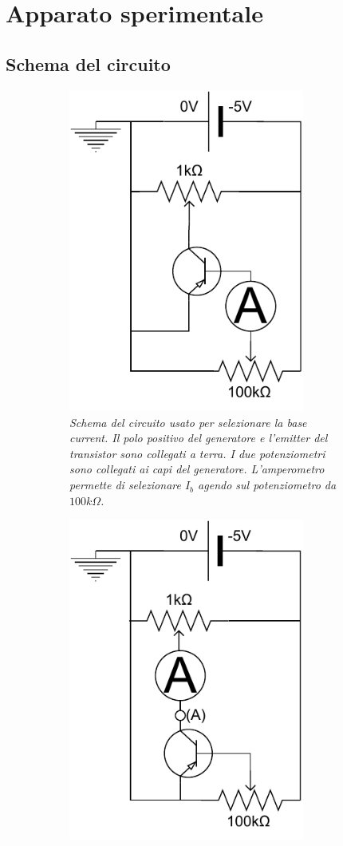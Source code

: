 \section{Apparato sperimentale}\label{sec:apparato-sperimentale}
  \subsection{Schema del circuito}\label{subsec:schema-circuito}
  \begin{figure}[h]
    \begin{subfigure}[t]{.47\textwidth}
      \includegraphics[width=7.75cm]{../assets/circuito-base-current.pdf}
      \caption{
        \emph{
          Schema del circuito usato per selezionare la base current. Il polo positivo del generatore e l'\emph{emitter}
          del transistor sono collegati a terra. I due potenziometri sono collegati ai capi del generatore. L'amperometro
          permette di selezionare $I_b$ agendo sul potenziometro da $100k\Omega$.
        }
      }
      \label{fig:circuito-base-current}
    \end{subfigure}
    \hspace{5mm}
    \begin{subfigure}[t]{.47\textwidth}
      \includegraphics[width=7.75cm]{../assets/circuito.pdf}

\end{subfigure}
\end{figure}
